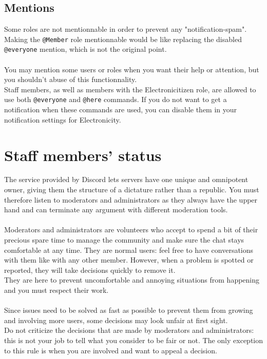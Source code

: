 \documentclass[a4paper]{article}
\begin{document}
\subsection{Mentions}
Some roles are not mentionnable in order to prevent any "notification-spam". Making the \texttt{@Member} role mentionnable would be like replacing the disabled \texttt{@everyone} mention, which is not the original point.\\\\
You may mention some users or roles when you want their help or attention, but you shouldn't abuse of this functionnality.\\
Staff members, as well as members with the Electronicitizen role, are allowed to use both \texttt{@everyone} and \texttt{@here} commands. If you do not want to get a notification when these commands are used, you can disable them in your notification settings for Electronicity.
\pagebreak

\section{Staff members' status}
The service provided by Discord lets servers have one unique and omnipotent owner, giving them the structure of a dictature rather than a republic. You must therefore listen to moderators and administrators as they always have the upper hand and can terminate any argument with different moderation tools.\\
\\
Moderators and administrators are volunteers who accept to spend a bit of their precious spare time to manage the community and make sure the chat stays comfortable at any time. They are normal users: feel free to have conversations with them like with any other member. However, when a problem is spotted or reported, they will take decisions quickly to remove it.\\
They are here to prevent uncomfortable and annoying situations from happening and you must respect their work.\\
\\
Since issues need to be solved as fast as possible to prevent them from growing and involving more users, some decisions may look unfair at first sight.\\
Do not criticize the decisions that are made by moderators and administrators: this is not your job to tell what you consider to be fair or not. The only exception to this rule is when you are involved and want to appeal a decision.
\pagebreak
\end{document}

